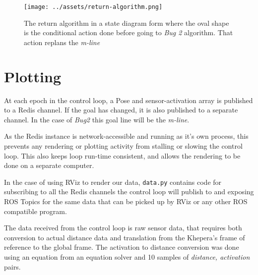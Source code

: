 \documentclass[11pt, a4paper]{article}
\begin{document}
\begin{figure}[H]
  \begin{center}
    \texttt{[image: ../assets/return-algorithm.png]}
    \caption{The return algorithm in a state diagram form where the oval shape is the conditional action done before going to \textit{Bug 2} algorithm. That action replans the \textit{m-line}}
  \end{center}
\end{figure} 



\section{Plotting}
\label{Plotting}

At each epoch in the control loop, a Pose and sensor-activation array is published to a Redis 
channel. If the goal has changed, it is also published to a separate channel. In the case of \textit{Bug2} this goal line will be the \textit{m-line}.

As the Redis instance is network-accessible and running as it's own process, this prevents any 
rendering or plotting activity from stalling or slowing the control loop. This also keeps loop 
run-time consistent, and allows the rendering to be done on a separate computer.

In the case of using RViz to render our data, \texttt{data.py} contains code for 
subscribing to all the Redis channels the control loop will publish to and exposing 
ROS Topics for the same data that can be picked up by RViz or any other ROS compatible 
program.

The data received from the control loop is raw sensor data, that requires both conversion to
actual distance data and translation from the Khepera's frame of reference to the global frame.
The activation to distance conversion was done using an equation from an equation solver and 10
samples of \textit{distance, activation} pairs.
\end{document}
